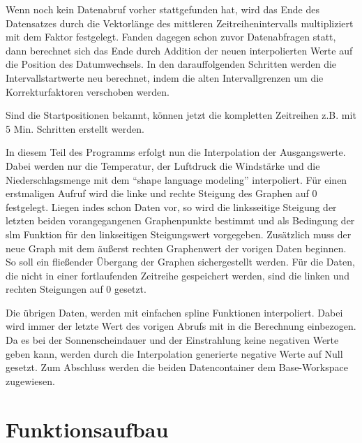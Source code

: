 
Wenn noch kein Datenabruf vorher stattgefunden hat, wird das Ende des Datensatzes durch die Vektorlänge des mittleren Zeitreihenintervalls multipliziert mit dem Faktor festgelegt. Fanden dagegen schon zuvor Datenabfragen statt, dann berechnet sich das Ende durch Addition der neuen interpolierten Werte auf die Position des Datumwechsels. In den darauffolgenden Schritten werden die Intervallstartwerte neu berechnet, indem die alten Intervallgrenzen um die Korrekturfaktoren verschoben werden.       

Sind die Startpositionen bekannt, können jetzt die kompletten Zeitreihen z.B. mit 5 Min. Schritten erstellt werden.

In diesem Teil des Programms erfolgt nun die Interpolation der Ausgangswerte. Dabei werden nur die Temperatur, der Luftdruck die Windstärke und die Niederschlagsmenge mit dem \enquote{shape language modeling} \cite{SLM} interpoliert. Für einen erstmaligen Aufruf wird die linke und rechte Steigung des Graphen auf 0 festgelegt. Liegen indes schon Daten vor, so wird die linksseitige Steigung der letzten beiden vorangegangenen Graphenpunkte bestimmt und als Bedingung der \textsf{slm} Funktion für den linkseitigen Steigungswert vorgegeben. Zusätzlich muss der neue Graph mit dem äußerst rechten Graphenwert der vorigen Daten beginnen. So soll ein fließender Übergang der Graphen sichergestellt werden. Für die Daten, die nicht in einer fortlaufenden Zeitreihe gespeichert werden, sind die linken und rechten Steigungen auf 0 gesetzt.   
 
Die übrigen Daten, werden mit einfachen \textsf{spline} Funktionen interpoliert. Dabei wird immer der letzte Wert des vorigen Abrufs mit in die Berechnung einbezogen. Da es bei der Sonnenscheindauer und der Einstrahlung keine negativen Werte geben kann, werden durch die Interpolation generierte negative Werte auf Null gesetzt. Zum Abschluss werden die beiden Datencontainer dem Base-Workspace zugewiesen.    

\section{Funktionsaufbau}